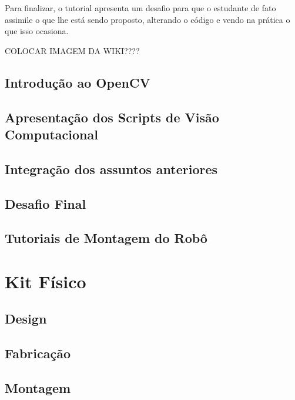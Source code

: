 Para finalizar, o tutorial apresenta um desafio para que o estudante de fato assimile o que lhe está sendo proposto, alterando o código e vendo na prática o que isso ocasiona.

COLOCAR IMAGEM DA WIKI????


\subsection{Introdução ao OpenCV}

\subsection{Apresentação dos Scripts de Visão Computacional}

\subsection{Integração dos assuntos anteriores}

\subsection{Desafio Final}

\subsection{Tutoriais de Montagem do Robô}

\section{Kit Físico}

\subsection{Design}

\subsection{Fabricação}

\subsection{Montagem}
 



